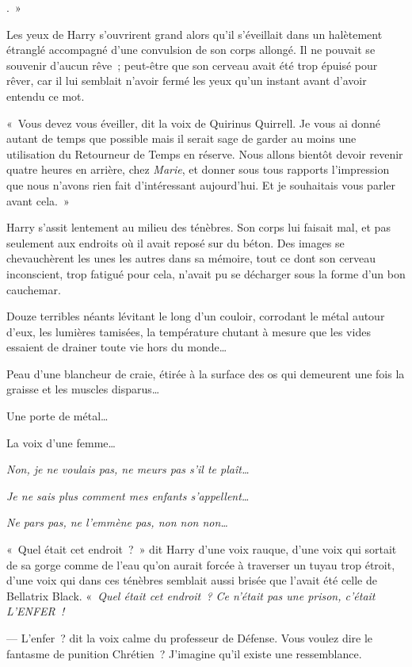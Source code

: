 
.~»

\hplettrineextrapara
Les yeux de Harry s'ouvrirent grand alors qu'il s'éveillait dans un halètement étranglé accompagné d'une convulsion de son corps allongé. Il ne pouvait se souvenir d'aucun rêve~; peut-être que son cerveau avait été trop épuisé pour rêver, car il lui semblait n'avoir fermé les yeux qu'un instant avant d'avoir entendu ce mot.

«~Vous devez vous éveiller, dit la voix de Quirinus Quirrell. Je vous ai donné autant de temps que possible mais il serait sage de garder au moins une utilisation du Retourneur de Temps en réserve. Nous allons bientôt devoir revenir quatre heures en arrière, chez \emph{Marie}, et donner sous tous rapports l'impression que nous n'avons rien fait d'intéressant aujourd'hui. Et je souhaitais vous parler avant cela.~»

Harry s'assit lentement au milieu des ténèbres. Son corps lui faisait mal, et pas seulement aux endroits où il avait reposé sur du béton. Des images se chevauchèrent les unes les autres dans sa mémoire, tout ce dont son cerveau inconscient, trop fatigué pour cela, n'avait pu se décharger sous la forme d'un bon cauchemar.

Douze terribles néants lévitant le long d'un couloir, corrodant le métal autour d'eux, les lumières tamisées, la température chutant à mesure que les vides essaient de drainer toute vie hors du monde…

Peau d'une blancheur de craie, étirée à la surface des os qui demeurent une fois la graisse et les muscles disparus…

Une porte de métal…

La voix d'une femme…

\emph{Non, je ne voulais pas, ne meurs pas s'il te plaît…}

\emph{Je ne sais plus comment mes enfants s'appellent…}

\emph{Ne pars pas, ne l'emmène pas, non non non…}

«~Quel était cet endroit~?~» dit Harry d'une voix rauque, d'une voix qui sortait de sa gorge comme de l'eau qu'on aurait forcée à traverser un tuyau trop étroit, d'une voix qui dans ces ténèbres semblait aussi brisée que l'avait été celle de Bellatrix Black. «~\emph{Quel était cet endroit~? Ce n'était pas une prison, c'était L'ENFER~!}

--- L'enfer~? dit la voix calme du professeur de Défense. Vous voulez dire le fantasme de punition Chrétien~? J'imagine qu'il existe une ressemblance.

